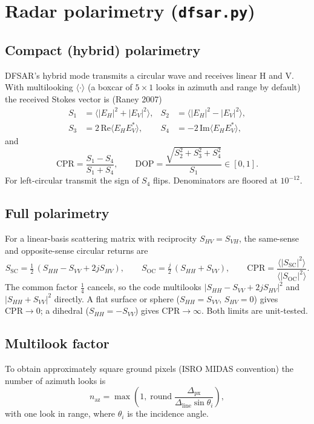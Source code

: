 \documentclass[11pt,a4paper]{article}
\newcommand{\code}[1]{\texttt{#1}}
\begin{document}
\section{Radar polarimetry (\code{dfsar.py})}

\subsection{Compact (hybrid) polarimetry}
DFSAR's hybrid mode transmits a circular wave and receives linear H and V. With multilooking
$\langle\cdot\rangle$ (a boxcar of $5\times1$ looks in azimuth and range by default) the
received Stokes vector is (Raney 2007)
\begin{align}
  S_1 &= \langle |E_H|^2+|E_V|^2\rangle, & S_2 &= \langle |E_H|^2-|E_V|^2\rangle,\\
  S_3 &= 2\,\mathrm{Re}\langle E_H E_V^*\rangle, & S_4 &= -2\,\mathrm{Im}\langle E_H E_V^*\rangle,
\end{align}
and
\begin{equation}
  \mathrm{CPR} = \frac{S_1-S_4}{S_1+S_4},\qquad
  \mathrm{DOP} = \frac{\sqrt{S_2^2+S_3^2+S_4^2}}{S_1}\in[0,1].
\end{equation}
For left-circular transmit the sign of $S_4$ flips. Denominators are floored at $10^{-12}$.

\subsection{Full polarimetry}
For a linear-basis scattering matrix with reciprocity $S_{HV}=S_{VH}$, the same-sense and
opposite-sense circular returns are
\begin{equation}
  S_{\mathrm{SC}} = \tfrac12\,(S_{HH}-S_{VV}+2jS_{HV}),\qquad
  S_{\mathrm{OC}} = \tfrac{j}{2}\,(S_{HH}+S_{VV}),\qquad
  \mathrm{CPR} = \frac{\langle|S_{\mathrm{SC}}|^2\rangle}{\langle|S_{\mathrm{OC}}|^2\rangle}.
\end{equation}
The common factor $\tfrac14$ cancels, so the code multilooks $|S_{HH}-S_{VV}+2jS_{HV}|^2$ and
$|S_{HH}+S_{VV}|^2$ directly. A flat surface or sphere ($S_{HH}=S_{VV}$, $S_{HV}=0$) gives
$\mathrm{CPR}\to0$; a dihedral ($S_{HH}=-S_{VV}$) gives $\mathrm{CPR}\to\infty$. Both limits are
unit-tested.

\subsection{Multilook factor}
To obtain approximately square ground pixels (ISRO MIDAS convention) the number of azimuth looks
is
\begin{equation}
  n_{\mathrm{az}} = \max\!\left(1,\operatorname{round}\frac{\Delta_{\mathrm{px}}}
  {\Delta_{\mathrm{line}}\sin\theta_i}\right),
\end{equation}
with one look in range, where $\theta_i$ is the incidence angle.
\end{document}
